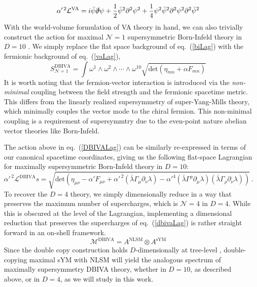 \documentclass[12pt,letter]{article}
\def\eqn#1{eq.~(\ref{#1})}
\def\be{\begin{equation}}
\def\ee{\end{equation}}
\begin{document}
 \be
   \alpha'^{\,2}\mathcal{L}^{\text{VA}} = i\bar{\psi}\slashed{\partial}\psi +\frac{1}{2} \bar{\psi}^2 \partial^2 \psi^2 + \frac{1}{4}\psi^2\bar{\psi}^2 \partial^2 \psi^2\partial^2 \bar{\psi}^2
 \ee
With the world-volume formulation of VA theory in hand, we can also trivially construct the action for maximal $\mathcal{N}=1$ supersymmetric Born-Infeld theory in $D=10$ \cite{Tseytlin:1999dj,Bergshoeff:2013pia}. We simply replace the flat space background of \eqn{biLag} with the fermionic background of \eqn{vaLag},
\be
 \label{DBIVALag}
S^{\text{DBIVA}}_{\mathcal{N}=1} = \int \omega^1 \wedge\omega^2 \wedge \cdots \wedge \omega^{10} \sqrt{\text{det}(\eta_{mn}+ \alpha F_{mn})}
\ee
It is worth noting that the fermion-vector interaction is introduced via the \textit{non-minimal} coupling between the field strength and the fermionic spacetime metric. This differs from the linearly realized supersymmetry of super-Yang-Mills theory, which minimally couples the vector mode to the chiral fermion. This non-minimal coupling is a requirement of supersymmtry due to the even-point nature abelian vector theories like Born-Infeld.

The action above in \eqn{DBIVALag} can be similarly re-expressed in terms of our canonical spacetime coordinates, giving us the following flat-space Lagrangian for maximally supersymmetric Born-Infeld theory in $D=10$: 
\begin{equation}
 \label{dbivaLag}
    \alpha'^{\,2}\mathcal{L}^{\text{DBIVA}}s = \sqrt{\text{det} \left(\eta_{\mu\nu}- \alpha' F_{\mu\nu} + \alpha'^{\,2} (\bar{\lambda} \Gamma_\mu \partial_\nu \lambda)- \alpha'^4(\bar{\lambda} \Gamma^\rho \partial_\mu \lambda )(\bar{\lambda} \Gamma_\rho \partial_\nu \lambda) \right)}
  \,.
\end{equation}
To recover the $D=4$ theory, we simply dimensionally reduce in a way that preserves the maximum number of supercharges, which is $\mathcal{N}=4$ in $D=4$. While this is obscured at the level of the Lagrangian, implementing a dimensional reduction that preserves the supercharges of \eqn{dbivaLag} is rather straight forward in an on-shell framework. 
\be
\mathcal{M}^{\text{DBIVA}} = A^{\text{NLSM}} \otimes A^{\text{sYM}}
\ee
Since the double copy construction holds $D$-dimensionally at tree-level \cite{BCJreview}, double-copying maximal sYM with NLSM will yield the analogous spectrum of maximally supersymmetry DBIVA theory, whether in $D=10$, as described above, or in $D=4$, as we will study in this work. 
\end{document}
